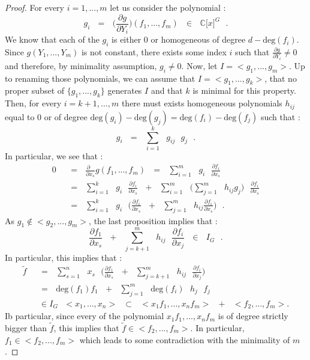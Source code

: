 \documentclass[envcountsame,envcountchap]{svmono}
\newcommand{\C}{\mathbb C}
\newcommand{\sub}{\subset}
\newcommand{\lb}{\lbrack}
\newcommand{\rb}{\rbrack}
\newcommand{\s}[2]{\sum\limits_{#1}^{#2}}
\newcommand{\qq}{\text{ }}
\begin{document}
\begin{proof}
	For every $i=1,..., m$ let us consider the polynomial :
	\begin{equation}
	g_i\qq =\qq \Big(\frac{\partial g}{\partial Y_i}\Big)(f_1,..., f_m)\qq \in \qq \C \lb x \rb^G\qq.
	\end{equation}
	We know that each of the $g_i$ is either $0$ or homogeneous of degree $d-\mbox{deg}(f_i)$. Since $g(Y_1,..., Y_m)$ is not constant, there exists some index $i$ such that $\frac{\partial g}{\partial Y_i}\not =0$ and therefore, by minimality assumption, $g_i\not=0$. Now, let $I = < g_1,..., g_m>$. Up to renaming those polynomials, we can assume that $I = < g_1,..., g_k>$, that no proper subset of $\{g_1,..., g_k\}$ generates $I$ and that $k$ is minimal for this property. Then, for every $i=k+1,..., m$ there must exists homogeneous polynomials $h_{ij}$ equal to $0$ or of degree $\mbox{deg}(g_i)-\mbox{deg}(g_j)=\mbox{deg}(f_i)-\mbox{deg}(f_j)$ such that :
	\begin{equation}
	g_i \qq =\qq \s{i=1}{k}\qq g_{ij}\qq g_j\qq. 
	\end{equation}
	In particular, we see that :
	\begin{equation}
	\begin{split}
	0\qq &=\qq \frac{\partial\qq }{\partial x_s}g(f_1,...,f_m)\qq=\qq \s{i=1}{m}\qq g_i\qq \frac{\partial f_i}{\partial x_s}\\
	&=\qq \s{i=1}{k}\qq g_i\qq \frac{\partial f_i}{\partial x_s} \qq+\qq \s{i=1}{m}\qq \bigg(\s{j=1}{m}\qq h_{ij}g_j\bigg)\qq  \frac{\partial f_i}{\partial x_s} \\
	&=\qq \s{i=1}{k}\qq g_i\qq \bigg(\frac{\partial f_i}{\partial x_s} \qq+\qq \s{j=1}{m}\qq h_{ij}  \frac{\partial f_i}{\partial x_s} \bigg)\qq.
	\end{split}
	\end{equation}
	As $g_1\not\in < g_2,..., g_m >$, the last proposition implies that :
	\begin{equation}
	\frac{\partial f_1}{\partial x_s}\qq+\qq \s{j=k+1}{m}\qq h_{ij}\qq \frac{\partial f_i}{\partial x_j}\qq \in \qq I_G\qq.
	\end{equation}
	In particular, this implies that  :
	\begin{equation}
	\begin{split}
		\tilde{f}\qq &=\qq \s{s=1}{n}\qq x_s \qq \bigg(\frac{\partial f_1}{\partial x_s}\qq+\qq \s{j=k+1}{m}\qq h_{ij}\qq \frac{\partial f_i}{\partial x_j}\bigg)\qq\\
		&=\qq \mbox{deg}(f_1)f_1\qq+\qq \s{j=1}{m}\qq \mbox{deg}(f_i)\qq h_j\qq f_j\qq \\
		&\in I_G \qq < x_1,..., x_n>\qq\sub \qq < x_1 f_1,..., x_n f_m >\qq+\qq < f_2,..., f_m>.
	\end{split}
	\end{equation}
	Ib particular, since every of the polynomial $x_1 f_1,..., x_n f_m$ is of degree strictly bigger than $\tilde{f}$, this implies that $\tilde{f}\in < f_2,..., f_m>$. In particular, $f_1 \in < f_2,..., f_m>$ which leads to some contradiction with the minimality of $m$.
\end{proof}
\end{document}

